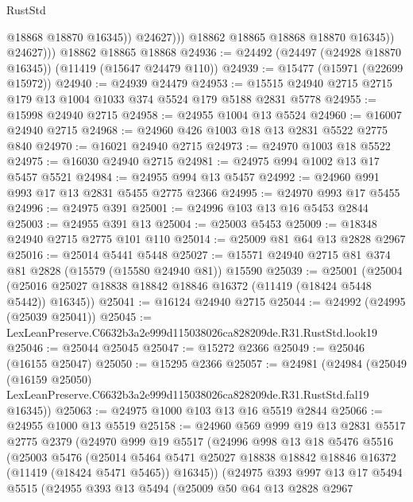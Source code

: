 \begin{lexlean}{RustStd}
\begin{coremodule}
                        @18868
                        @18870
                        @16345))
                    @24627)))
              @18862
              @18865
              @18868
              @18870
              @16345))
          @24627)))
    @18862
    @18865
    @18868
@24936 := @24492 (@24497 (@24928 @18870 @16345)) (@11419 (@15647 @24479 @110))
@24939 := @15477 (@15971 (@22699 @15972))
@24940 := @24939 @24479
@24953 := @15515 @24940 @2715 @2715 @179 @13 @1004 @1033 @374 @5524 @179 @5188 @2831 @5778
@24955 := @15998 @24940 @2715
@24958 := @24955 @1004 @13 @5524
@24960 := @16007 @24940 @2715
@24968 := @24960 @426 @1003 @18 @13 @2831 @5522 @2775 @840
@24970 := @16021 @24940 @2715
@24973 := @24970 @1003 @18 @5522
@24975 := @16030 @24940 @2715
@24981 := @24975 @994 @1002 @13 @17 @5457 @5521
@24984 := @24955 @994 @13 @5457
@24992 := @24960 @991 @993 @17 @13 @2831 @5455 @2775 @2366
@24995 := @24970 @993 @17 @5455
@24996 := @24975 @391
@25001 := @24996 @103 @13 @16 @5453 @2844
@25003 := @24955 @391 @13
@25004 := @25003 @5453
@25009 := @18348 @24940 @2715 @2775 @101 @110
@25014 := @25009 @81 @64 @13 @2828 @2967
@25016 := @25014 @5441 @5448
@25027 := @15571 @24940 @2715 @81 @374 @81 @2828 (@15579 (@15580 @24940 @81)) @15590
@25039 := @25001
    (@25004 (@25016 @25027 @18838 @18842 @18846 @16372 (@11419 (@18424 @5448 @5442)) @16345))
@25041 := @16124 @24940 @2715
@25044 := @24992 (@24995 (@25039 @25041))
@25045 := LexLeanPreserve.C6632b3a2e999d115038026ca828209de.R31.RustStd.look19
@25046 := @25044 @25045
@25047 := @15272 @2366
@25049 := @25046 (@16155 @25047)
@25050 := @15295 @2366
@25057 := @24981
    (@24984
      (@25049
        (@16159 @25050)
        LexLeanPreserve.C6632b3a2e999d115038026ca828209de.R31.RustStd.fal19
        @16345))
@25063 := @24975 @1000 @103 @13 @16 @5519 @2844
@25066 := @24955 @1000 @13 @5519
@25158 := @24960
    @569
    @999
    @19
    @13
    @2831
    @5517
    @2775
    @2379
    (@24970
      @999
      @19
      @5517
      (@24996
        @998
        @13
        @18
        @5476
        @5516
        (@25003
          @5476
          (@25014
            @5464
            @5471
            @25027
            @18838
            @18842
            @18846
            @16372
            (@11419 (@18424 @5471 @5465))
            @16345))
        (@24975
          @393
          @997
          @13
          @17
          @5494
          @5515
          (@24955
            @393
            @13
            @5494
            (@25009
              @50
              @64
              @13
              @2828
              @2967

\end{coremodule}
\end{lexlean}
